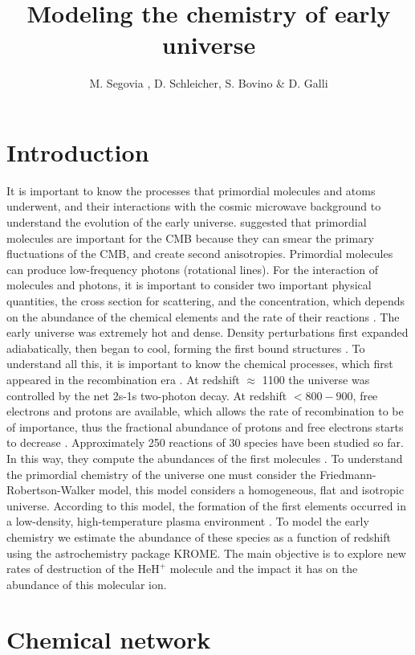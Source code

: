 \documentclass[baaa]{baaa}
\title{Modeling the chemistry of early universe}
\author{
M. Segovia \inst{1},
D. Schleicher\inst{1},
S. Bovino \inst{1}
\&
D. Galli \inst{2}
}
\institute{
Departamento de Astronom{\'\i}a, Universidad de Concepci\'on, Chile \and   
INAF - Osservatorio Astrofisico di Arcetri, Italy
}
\begin{document}
\maketitle

\section{Introduction}


It is important to know the processes that primordial molecules and atoms underwent, and their interactions with the cosmic microwave background to understand the evolution of the early universe. 
\citet{Maoli1994} suggested that primordial molecules are important for the CMB because they can smear the primary fluctuations of the CMB, and create second anisotropies.
Primordial molecules can produce low-frequency photons (rotational lines). For the interaction of molecules and photons, it is important to consider two important physical quantities, the cross section for scattering, and the concentration, which depends on the abundance of the chemical elements and the rate of their reactions \citet{Dubrovich1997}. 
The early universe was extremely hot and dense. Density perturbations first expanded adiabatically, then began to cool, forming the first bound structures \citet{Leep2002}. To understand all this, it is important to know the chemical processes, which first appeared in the recombination era \citet{Dalgarno2005}.
At redshift $\approx$ 1100 the universe was controlled by the net 2s-1s two-photon decay.  At redshift $<800-900$, free electrons and protons are available, which allows the rate of recombination to be of importance, thus the fractional abundance of protons and free electrons starts to decrease \citet{Chluba2010}. 
Approximately 250 reactions of 30 species have been studied so far. In this way, they compute the abundances of the first molecules \citet{Gay2011}. To understand the primordial chemistry of the universe one must consider the Friedmann-Robertson-Walker model, this model considers a homogeneous, flat and isotropic universe. According to this model, the formation of the first elements occurred in a low-density, high-temperature plasma environment \citet{GP2013}.
To model the early chemistry we estimate the abundance of these species as a function of redshift using the astrochemistry package \textsc{KROME}. The main objective is to explore new rates of destruction of the $\mathrm{HeH^+}$ molecule and the impact it has on the abundance of this molecular ion.


\section{Chemical network}
\end{document}
